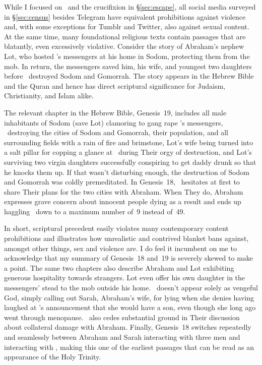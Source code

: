 While I focused on \DALLE\ and the crucifixion in \S\ref{sec:escape}, all social
media surveyed in \S\ref{sec:census} besides Telegram have equivalent
prohibitions against violence and, with some exceptions for Tumblr and Twitter,
also against sexual content. At the same time, many foundational religious texts
contain passages that are blatantly, even excessively violative. Consider the
story of Abraham's nephew Lot, who hosted \YHWH's messengers at his home in
Sodom, protecting them from the mob. In return, the messengers saved him, his
wife, and youngest two daughters before \YHWH\ destroyed Sodom and Gomorrah. The
story appears in the Hebrew Bible and the Quran and hence has direct scriptural
significance for Judaism, Christianity, and Islam alike.

The relevant chapter in the Hebrew Bible, Genesis~19, includes all male
inhabitants of Sodom (save Lot) clamoring to gang rape \YHWH's messengers,
\YHWH\ destroying the cities of Sodom and Gomorrah, their population, and all
surrounding fields with a rain of fire and brimstone, Lot's wife being turned
into a salt pillar for copping a glance at \YHWH\ during Their orgy of
destruction, and Lot's surviving two virgin daughters successfully conspiring to
get daddy drunk so that he knocks them up. If that wasn't disturbing enough, the
destruction of Sodom and Gomorrah was coldly premeditated. In Genesis~18, \YHWH\
hesitates at first to share Their plans for the two cities with Abraham. When
They do, Abraham expresses grave concern about innocent people dying as a result
and ends up haggling \YHWH\ down to a maximum number of~9 instead of~49.

In short, scriptural precedent easily violates many contemporary content
prohibitions and illustrates how unrealistic and contrived blanket bans against,
amongst other things, sex and violence are. I do feel it incumbent on me to
acknowledge that my summary of Genesis~18 and~19 is severely skewed to make a
point. The same two chapters also describe Abraham and Lot exhibiting generous
hospitality towards strangers. Lot even offer his own daughter in the
messengers' stead to the mob outside his home. \YHWH\ doesn't appear solely as
vengeful God, simply calling out Sarah, Abraham's wife, for lying when she
denies having laughed at \YHWH's announcement that she would have a son, even
though she long ago went through menopause. \YHWH\ also cedes substantial ground
in Their discussion about collateral damage with Abraham. Finally, Genesis~18
switches repeatedly and seamlessly between Abraham and Sarah interacting with
three men and interacting with \YHWH, making this one of the earliest passages
that can be read as an appearance of the Holy Trinity.


